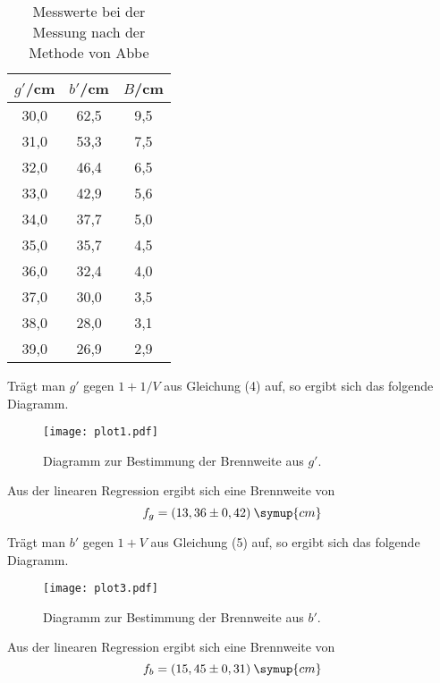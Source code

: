 \begin{table}[H]
  \centering
  \caption{Messwerte bei der Messung nach der Methode von Abbe}
  \label{tab:abbe}
  \begin{tabular}{c c c}
    \toprule
    $g'$/cm  & $b'$/cm & $B$/cm \\
    \midrule
    30,0  &  62,5  &  9,5 \\
    31,0  &  53,3  &  7,5 \\
    32,0  &  46,4  &  6,5 \\
    33,0  &  42,9  &  5,6 \\
    34,0  &  37,7  &  5,0 \\
    35,0  &  35,7  &  4,5 \\
    36,0  &  32,4  &  4,0 \\
    37,0  &  30,0  &  3,5 \\
    38,0  &  28,0  &  3,1 \\
    39,0  &  26,9  &  2,9 \\
    \bottomrule
  \end{tabular}
\end{table}

Trägt man $g'$ gegen $1+1/V$ aus Gleichung (4) auf, so ergibt sich das folgende Diagramm.

\begin{figure}[H]
  \centering
  \texttt{[image: plot1.pdf]}
  \caption{Diagramm zur Bestimmung der Brennweite aus $g'$.}
  \label{fig:plot1}
\end{figure}

Aus der linearen Regression ergibt sich eine Brennweite von
\begin{equation*}
  f_g = (13,36 \pm 0,42)\: \symup{cm}
\end{equation*}

Trägt man $b'$ gegen $1+V$ aus Gleichung (5) auf, so ergibt sich das folgende Diagramm.

\begin{figure}[H]
  \centering
  \texttt{[image: plot3.pdf]}
  \caption{Diagramm zur Bestimmung der Brennweite aus $b'$.}
  \label{fig:plot3}
\end{figure}

Aus der linearen Regression ergibt sich eine Brennweite von
\begin{equation*}
  f_b = (15,45 \pm 0,31)\: \symup{cm}
\end{equation*}
